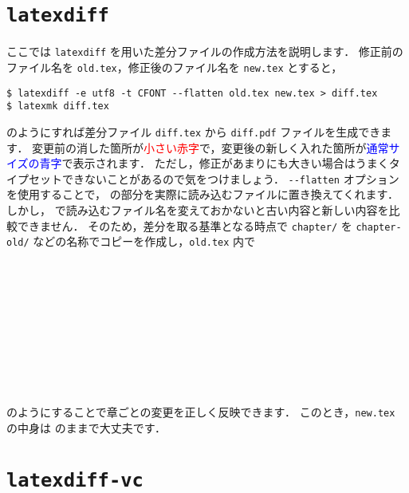 \section{\texttt{latexdiff}}
\label{sec:latexdiff}

ここでは \verb|latexdiff| を用いた差分ファイルの作成方法を説明します．
修正前のファイル名を \verb|old.tex|，修正後のファイル名を \verb|new.tex| とすると，
\begin{tcolorbox}[title={\texttt{latexdiff} を使用した差分ファイルの生成方法}]
\begin{verbatim}
$ latexdiff -e utf8 -t CFONT --flatten old.tex new.tex > diff.tex
$ latexmk diff.tex
\end{verbatim}
\end{tcolorbox}
\noindent
のようにすれば差分ファイル \verb|diff.tex| から \verb|diff.pdf| ファイルを生成できます．
変更前の消した箇所が\textcolor{red}{\scriptsize 小さい赤字}で，変更後の新しく入れた箇所が\textcolor{blue}{\sffamily 通常サイズの青字}で表示されます．
ただし，修正があまりにも大きい場合はうまくタイプセットできないことがあるので気をつけましょう．
\verb|--flatten| オプションを使用することで，\verb|| の部分を実際に読み込むファイルに置き換えてくれます．
しかし，\verb|| で読み込むファイル名を変えておかないと古い内容と新しい内容を比較できません．
そのため，差分を取る基準となる時点で \verb|chapter/| を \verb|chapter-old/| などの名称でコピーを作成し，\verb|old.tex| 内で
\begin{verbatim}











\end{verbatim}
のようにすることで章ごとの変更を正しく反映できます．
このとき，\verb|new.tex| の中身は \verb|| のままで大丈夫です．

\section{\texttt{latexdiff-vc}}
\label{sec:latexdiff-vc}

